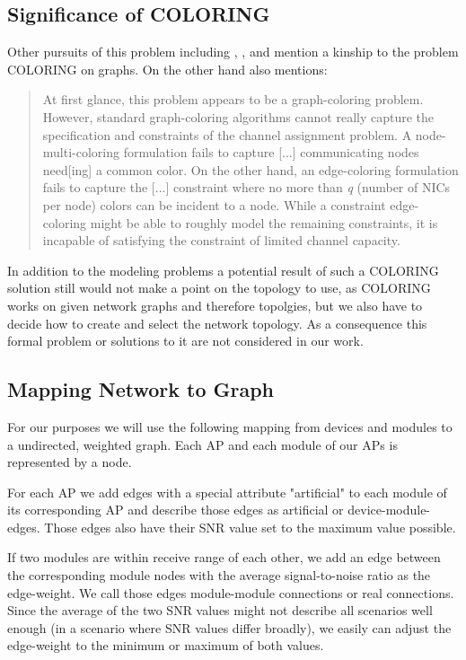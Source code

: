   \subsection{Significance of COLORING}
    Other pursuits of this problem including \cite{BFS-CA}, \cite{CTA}, \cite{caa_tricky} and \cite{katzela} mention a kinship to the problem COLORING on graphs.
    On the other hand \cite{caa_tricky} also mentions:
    
    \begin{quote}
      At first glance, this problem appears to be a graph-coloring problem. However, standard graph-coloring algorithms cannot really capture the specification and constraints 
      of the channel assignment problem. A node-multi-coloring formulation fails to capture [...] communicating nodes need[ing] a common color. On the other hand,
      an edge-coloring formulation fails to capture the [...] constraint where no more than \textit{q} (number of NICs per node) colors can be incident to a node.
      While a constraint edge-coloring might be able to roughly model the remaining constraints, it is incapable of satisfying the constraint of limited channel capacity.
    \end{quote}
    
    In addition to the modeling problems a potential result of such a COLORING solution still would not make a point on the topology to use,
    as COLORING works on given network graphs and therefore topolgies, but we also have to decide how to create and select the network topology.
    As a consequence this formal problem or solutions to it are not considered in our work.
    
  \subsection{Mapping Network to Graph}
    For our purposes we will use the following mapping from devices and modules to a undirected, weighted graph.
    Each \ac{AP} and each module of our APs is represented by a node.
    
    For each \ac{AP} we add edges with a special attribute "artificial" 
    to each module of its corresponding \ac{AP} and describe those edges as artificial or device-module-edges.
    Those edges also have their \ac{SNR} value set to the maximum value possible. 
    
    If two modules are within receive range of each other, 
    we add an edge between the corresponding module nodes with the average signal-to-noise ratio as the edge-weight.
    We call those edges module-module connections or real connections.
    Since the average of the two \ac{SNR} values might not describe all scenarios well enough (in a scenario where \ac{SNR} values differ broadly),
    we easily can adjust the edge-weight to the minimum or maximum of both values.
    
